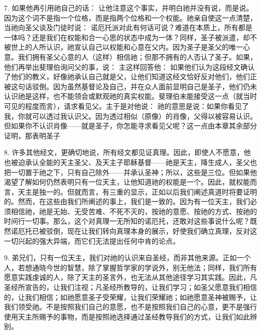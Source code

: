 7. 如果他再引用祂自己的话： 让他注意这个事实，并明白祂并没有说，而是说。因为这个词不是指一个位格，而是指两个位格和一个权能。祂亲自使这一点清楚，当祂向圣父谈及门徒时说： 诺厄托派对此有何话可说？难道在本质上，所有都是一体吗？还是我们在权能和合一心思的状态中成为一体？同样，圣子被派遣，却不被世上的人所认识，祂宣认自己以权能和心意在父内。因为圣子是圣父的唯一心意。我们拥有圣父心意的人（这样）相信祂；但那不拥有的人否认了圣子。如果，他们再举出斐理伯询问父的事，说： 主这样回答他： 如果他们认为这段经文确认了他们的教义，好像祂承认自己就是父，让他们知道这经文恰好反对他们，他们正被这句话驳倒。因为虽然基督论及自己，并在众人面前显明自己是圣子，他们仍未认识祂是这样，也不能领会或默观祂的真实权能。斐理伯未能接受这一点（就当时可见的程度而言），请求看见父。主于是对他说： 祂的意思是说：如果你看见了我，你就可以透过我认识父。因为透过相似（原像）的肖像，父得以被容易认识。但如果你不认识肖像——就是圣子，你怎能寻求看见父呢？这一点由本章其余部分证明，那表明圣子\par

8. 许多其他经文，更确切地说，所有经文都见证真理。因此，即使人不愿意，他也被迫承认全能的天主圣父、及天主子耶稣基督——祂是天主，降生成人，圣父也把一切置于祂之下，只有自己除外——并承认圣神；所以，这些是三位。但如果他渴望了解如何仍然表明只有一位天主，让他知道祂的权能是一个。因此，就权能而言，天主是独一的。但就而言，有三重的显示，正如以后我们阐述真道时将要证明的。然而，在这些由我们所阐述的事上，我们是一致的。因为有一位天主，我们必须相信祂，祂是无始、无受苦难、不死不灭的，按祂的意愿、按祂的方式、按祂的时间行一切事。那么，这个对真理一无所知的诺厄托，还敢对这些事说什么呢？既然诺厄托已被驳倒，现在让我们转向真理本身的展示，好使我们确立真理，反对这一切兴起的强大异端，而它们无法提出任何中肯的论点。\par

9. 弟兄们，只有一位天主，我们对祂的认识来自圣经，而非其他来源。正如一个人，若想通晓今世的智慧，除了掌握哲学家的学说外，别无他法；同样，我们所有愿意实践虔诚的人，除了天主的圣言外，也无法从其他途径学习其实践。因此，凡圣经所宣告的，让我们注视；凡圣经所教导的，让我们学习；如圣父愿意我们相信的，让我们相信；如祂愿意圣子受荣耀，让我们荣耀祂；如祂愿意圣神被赐予，让我们领受祂。不是按照我们自己的意愿，也不是按照我们自己的心意，更不是强行使用天主所赐予的事物，而是按照祂选择通过圣经教导我们的方式，让我们如此辨别。\par

